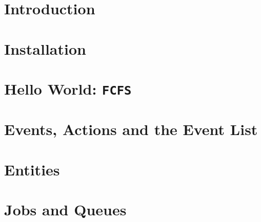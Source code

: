 \documentclass[12pt]{book}
\begin{document}
\chapter{Introduction}
\label{chap:intro}


\chapter{Installation}
\label{chap:install}


\chapter{Hello World: \texttt{\bf FCFS}}
\label{chap:hello-world}


\chapter{Events, Actions and the Event List}
\label{chap:events-actions-event-list}


\chapter{Entities}
\label{chap:entities}


\chapter{Jobs and Queues}
\label{chap:jobs-and-queues}


%

%

%

%
\end{document}
